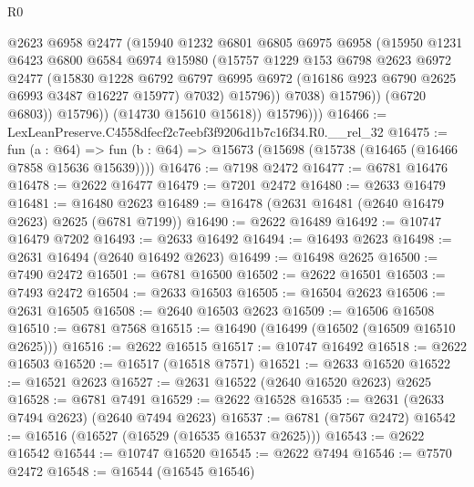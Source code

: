 \begin{lexlean}{R0}
\begin{coremodule}
                      @2623
                      @6958
                      @2477
                      (@15940
                        @1232
                        @6801
                        @6805
                        @6975
                        @6958
                        (@15950
                          @1231
                          @6423
                          @6800
                          @6584
                          @6974
                          @15980
                          (@15757
                            @1229
                            @153
                            @6798
                            @2623
                            @6972
                            @2477
                            (@15830
                              @1228
                              @6792
                              @6797
                              @6995
                              @6972
                              (@16186 @923 @6790 @2625 @6993 @3487 @16227 @15977)
                              @7032)
                            @15796))
                        @7038)
                      @15796))
                  (@6720 @6803))
                @15796))
            (@14730 @15610 @15618))
          @15796)))
@16466 := LexLeanPreserve.C4558dfecf2c7eebf3f9206d1b7c16f34.R0.__rel_32
@16475 := fun (a : @64) =>
  fun (b : @64) => @15673 (@15698 (@15738 (@16465 (@16466 @7858 @15636 @15639))))
@16476 := @7198 @2472
@16477 := @6781 @16476
@16478 := @2622 @16477
@16479 := @7201 @2472
@16480 := @2633 @16479
@16481 := @16480 @2623
@16489 := @16478 (@2631 @16481 (@2640 @16479 @2623) @2625 (@6781 @7199))
@16490 := @2622 @16489
@16492 := @10747 @16479 @7202
@16493 := @2633 @16492
@16494 := @16493 @2623
@16498 := @2631 @16494 (@2640 @16492 @2623)
@16499 := @16498 @2625
@16500 := @7490 @2472
@16501 := @6781 @16500
@16502 := @2622 @16501
@16503 := @7493 @2472
@16504 := @2633 @16503
@16505 := @16504 @2623
@16506 := @2631 @16505
@16508 := @2640 @16503 @2623
@16509 := @16506 @16508
@16510 := @6781 @7568
@16515 := @16490 (@16499 (@16502 (@16509 @16510 @2625)))
@16516 := @2622 @16515
@16517 := @10747 @16492
@16518 := @2622 @16503
@16520 := @16517 (@16518 @7571)
@16521 := @2633 @16520
@16522 := @16521 @2623
@16527 := @2631 @16522 (@2640 @16520 @2623) @2625
@16528 := @6781 @7491
@16529 := @2622 @16528
@16535 := @2631 (@2633 @7494 @2623) (@2640 @7494 @2623)
@16537 := @6781 (@7567 @2472)
@16542 := @16516 (@16527 (@16529 (@16535 @16537 @2625)))
@16543 := @2622 @16542
@16544 := @10747 @16520
@16545 := @2622 @7494
@16546 := @7570 @2472
@16548 := @16544 (@16545 @16546)

\end{coremodule}
\end{lexlean}
